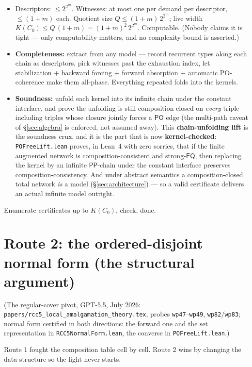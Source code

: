 \documentclass[11pt]{article}
\newcommand{\PO}{\ensuremath{\mathsf{PO}}}
\newcommand{\PP}{\ensuremath{\mathsf{PP}}}
\newcommand{\EQ}{\ensuremath{\mathsf{EQ}}}
\newcommand{\code}[1]{\texttt{#1}}
\begin{document}
\begin{itemize}
\item Descriptors: $\le 2^{2^m}$. Witnesses: at most one per demand per
  descriptor, $\le(1+m)$ each. Quotient size
  $Q\le(1+m)\,2^{2^m}$; live width
  $K(C_0)\le Q\,(1+m)=(1+m)^2\,2^{2^m}$. Computable. (Nobody claims it
  is tight --- only computability matters, and no complexity bound is
  asserted.)
\item \textbf{Completeness:} extract from any model --- record
  recurrent types along each chain as descriptors, pick witnesses past
  the exhaustion index, let stabilization $+$ backward forcing $+$
  forward absorption $+$ automatic PO-coherence make them all-phase.
  Everything repeated folds into the kernels.
\item \textbf{Soundness:} unfold each kernel into its infinite chain
  under the constant interface, and prove the unfolding is still
  composition-closed on \emph{every} triple --- including triples whose
  closure jointly forces a $\PO$ edge (the multi-path caveat of
  \S\ref{sec:algebra} is enforced, not assumed away). This
  \textbf{chain-unfolding lift} is the soundness crux, and it is the
  part that is now \textbf{kernel-checked}: \code{POFreeLift.lean}
  proves, in Lean~4 with zero sorries, that if the finite augmented
  network is composition-consistent and strong-$\EQ$, then replacing
  the kernel by an infinite $\PP$-chain under the constant interface
  preserves composition-consistency. And under abstract semantics a
  composition-closed total network \emph{is} a model
  (\S\ref{sec:architecture}) --- so a valid certificate delivers an
  actual infinite model outright.
\end{itemize}

Enumerate certificates up to $K(C_0)$, check, done.

\section{Route 2: the ordered-disjoint normal form (the structural
argument)}\label{sec:route2}

{\small(The regular-cover pivot, GPT-5.5, July 2026:
\code{papers/rcc5\_local\_amalgamation\_theory.tex}, probes
\code{wp47}--\code{wp49}, \code{wp82}/\code{wp83}; normal form
certified in both directions: the forward one and the set representation in
\code{RCC5NormalForm.lean}, the converse in \code{POFreeLift.lean}.)}

Route 1 fought the composition table cell by cell. Route 2 wins by
changing the data structure so the fight never starts.
\end{document}
